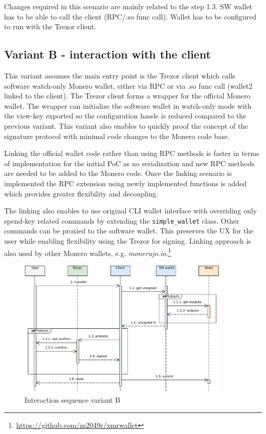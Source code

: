 \documentclass[]{article}
\begin{document}
Changes required in this scenario are mainly related to the step 1.3. SW wallet has to be able to call the client (RPC/.so func call). Wallet has to be configured to run with the Trezor client.

\subsection{Variant B - interaction with the client}
This variant assumes the main entry point is the Trezor client which calls software watch-only Monero wallet, either via RPC or via .so func call (wallet2 linked to the client). The Trezor client forms a wrapper for the official Monero wallet. The wrapper can initialize the software wallet in watch-only mode with the view-key exported so the configuration hassle is reduced compared to the previous variant. This variant also enables to quickly proof the concept of the signature protocol with minimal code changes to the Monero code base. 

Linking the official wallet code rather than using RPC methods is faster in terms of implementation for the initial PoC as no serialization and new RPC methods are needed to be added to the Monero code. Once the linking scenario is implemented the RPC extension using newly implemented functions is added which provides greater flexibility and decoupling.

The linking also enables to use original CLI wallet interface with overriding only spend-key related commands by extending the \verb|simple_wallet| class. Other commands can be proxied to the software wallet. This preserves the UX for the user while enabling flexibility using the Trezor for signing. Linking approach is also used by other Monero wallets, e.g. \emph{monerujo.io}.\footnote{\url{https://github.com/m2049r/xmrwallet}}

\begin{figure}[H]
	\centering
	\includegraphics[width=0.9\textwidth, angle=0]{variantB.pdf}
	\caption{Interaction sequence variant B}
\end{figure}
\end{document}
